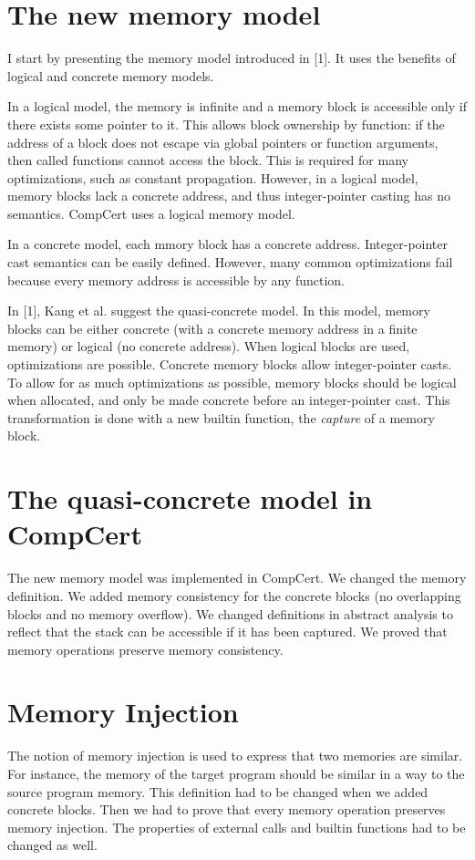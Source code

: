 \documentclass[nocopyrightspace]{sigplanconf}
\begin{document}
\section{The new memory model}
I start by presenting the memory model introduced in [1]. It uses the benefits of logical and concrete memory models.

In a logical model, the memory is infinite and a memory block is accessible only if there exists some pointer to it. This allows block ownership by function: if the address of a block does not escape via global pointers or function arguments, then called functions cannot access the block. This is required for many optimizations, such as constant propagation. However, in a logical model, memory blocks lack a concrete address, and thus integer-pointer casting has no semantics. CompCert uses a logical memory model.

In a concrete model, each mmory block has a concrete address. Integer-pointer cast semantics can be easily defined. However, many common optimizations fail because every memory address is accessible by any function.

In [1], Kang et al. suggest the quasi-concrete model. In this model, memory blocks can be either concrete (with a concrete memory address in a finite memory) or logical (no concrete address). When logical blocks are used, optimizations are possible. Concrete memory blocks allow integer-pointer casts. To allow for as much optimizations as possible, memory blocks should be logical when allocated, and only be made concrete before an integer-pointer cast. This transformation is done with a new builtin function, the \textit{capture} of a memory block.

\section{The quasi-concrete model in CompCert}
The new memory model was implemented in CompCert. We changed the memory definition. We added memory consistency for the concrete blocks (no overlapping blocks and no memory overflow). We changed definitions in abstract analysis to reflect that the stack can be accessible if it has been captured. We proved that memory operations preserve memory consistency.

\section{Memory Injection}
The notion of memory injection is used to express that two memories are similar. For instance, the memory of the target program should be similar in a way to the source program memory. This definition had to be changed when we added concrete blocks. Then we had to prove that every memory operation preserves memory injection. The properties of external calls and builtin functions had to be changed as well. 
\end{document}
